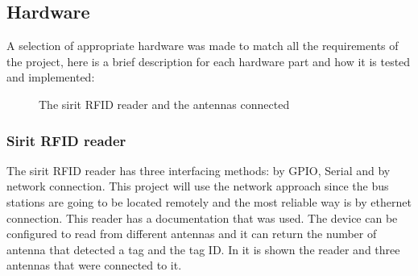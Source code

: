 \documentclass[a4paper,twoside]{article}
\begin{document}
\subsection{Hardware}
A selection of appropriate hardware was made to match all the requirements of the project, here is a brief description for each hardware part and how it is tested and implemented:
\begin{figure}[h]
\centering
{}
\caption{The sirit RFID reader and the antennas connected}
\label{sirireader}
\end{figure}
\subsubsection{Sirit RFID reader}
The sirit RFID reader has three interfacing methods: by GPIO, Serial and by network connection. This project will use the network approach since the bus stations are going to be located remotely and the most reliable way is by ethernet connection. This reader has a documentation that was used. The device can be configured to read from different antennas and it can return the number of antenna that detected a tag and the tag ID. In  it is shown the reader and three antennas that were connected to it. 
\end{document}
